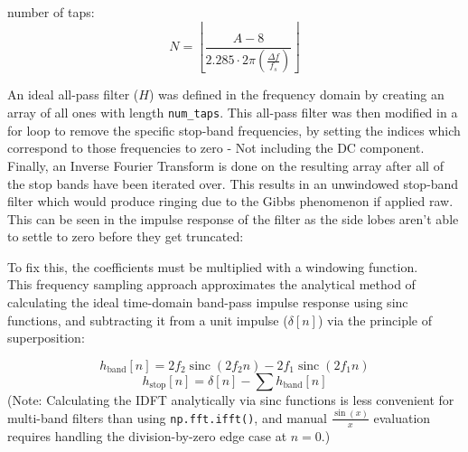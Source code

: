 \documentclass[8pt]{extarticle}
\begin{document}
number of taps:
\begin{equation}
N = \left\lfloor \frac{A - 8}{2.285 \cdot 2\pi \left( \frac{\Delta f}{f_s} \right)} \right\rfloor
\end{equation}

An ideal all-pass filter ($H$) was defined in the frequency domain by creating an array of all ones with length \texttt{num\_taps}.
This all-pass filter was then modified in a for loop to remove the specific stop-band frequencies, by setting the indices which correspond to those frequencies to zero - Not including the DC component.
Finally, an Inverse Fourier Transform is done on the resulting array after all of the stop bands have been iterated over. This results in an unwindowed stop-band filter which would produce ringing due to the Gibbs phenomenon if applied raw.
This can be seen in the impulse response of the filter as the side lobes aren't able to settle to zero before they get truncated:




To fix this, the coefficients must be multiplied with a windowing function.\\

This frequency sampling approach approximates the analytical method of calculating the ideal time-domain band-pass impulse response using sinc functions, and subtracting it from a unit impulse ($\delta[n]$) via the principle of superposition:

\begin{equation}
h_{\text{band}}[n] = 2 f_2 \operatorname{sinc}(2 f_2 n) - 2 f_1 \operatorname{sinc}(2 f_1 n)
\end{equation}
\begin{equation}
h_{\text{stop}}[n] = \delta[n] - \sum h_{\text{band}}[n]
\end{equation}
{\tiny (Note: Calculating the IDFT analytically via sinc functions is less convenient for multi-band filters than using \texttt{np.fft.ifft()}, 
        and manual $\frac{\sin(x)}{x}$ evaluation requires handling the division-by-zero edge case at $n = 0$.)}
\end{document}
